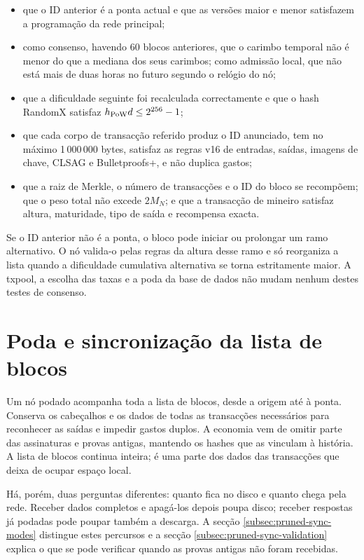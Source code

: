 \begin{itemize}
\item que o ID anterior é a ponta actual e que as versões maior e menor
      satisfazem a programação da rede principal;
\item como consenso, havendo 60 blocos anteriores, que o carimbo temporal não
      é menor do que a mediana dos seus carimbos; como admissão local, que não
      está mais de duas horas no futuro segundo o relógio do nó;
\item que a dificuldade seguinte foi recalculada correctamente e que o hash
      RandomX satisfaz $h_{\rm PoW}d\leq2^{256}-1$;
\item que cada corpo de transacção referido produz o ID anunciado, tem no
      máximo 1\,000\,000 bytes, satisfaz as regras v16 de entradas, saídas,
      imagens de chave, CLSAG e Bulletproofs+, e não duplica gastos;
\item que a raiz de Merkle, o número de transacções e o ID do bloco se
      recompõem; que o peso total não excede $2M_N$; e que a transacção de
      mineiro satisfaz altura, maturidade, tipo de saída e recompensa exacta.
\end{itemize}

Se o ID anterior não é a ponta, o bloco pode iniciar ou prolongar um ramo
alternativo. O nó valida-o pelas regras da altura desse ramo e só reorganiza a
lista quando a dificuldade cumulativa alternativa se torna estritamente
maior. A txpool, a escolha das taxas e a poda da base de dados não mudam nenhum
destes testes de consenso.


\section{Poda e sincronização da lista de blocos}
\label{sec:node-pruning}

Um nó podado acompanha toda a lista de blocos, desde a origem até à ponta.
Conserva os cabeçalhos e os dados de todas as transacções necessários para
reconhecer as saídas e impedir gastos duplos. A economia vem de omitir parte
das assinaturas e provas antigas, mantendo os hashes que as vinculam à
história. A lista de blocos continua inteira; é uma parte dos dados das transacções
que deixa de ocupar espaço local.

Há, porém, duas perguntas diferentes: quanto fica no disco e quanto chega
pela rede. Receber dados completos e apagá-los depois poupa disco;
receber respostas já podadas pode poupar também a descarga. A secção
\ref{subsec:pruned-sync-modes} distingue estes percursos e a secção
\ref{subsec:pruned-sync-validation} explica o que se pode verificar quando
as provas antigas não foram recebidas.

